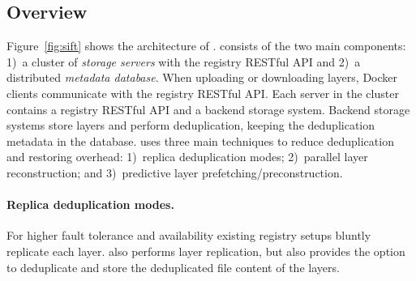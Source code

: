 \subsection{Overview}
\label{sec:overview}



Figure~\ref{fig:sift} shows the architecture of \sysname.
%
\sysname consists of the two main components: %
1)~a cluster of \emph{storage servers}
with the registry RESTful API and 2)~a distributed
\emph{metadata database}. 
%
When uploading or downloading layers, 
Docker clients communicate with the
registry RESTful API.
%
%
Each server in the cluster contains a registry RESTful API and a backend storage system.
%
Backend storage systems store
layers and perform deduplication, keeping the deduplication metadata in the
database.
%
%
%
\sysname uses three main techniques to reduce deduplication and restoring overhead:
1)~replica deduplication modes; 2)~parallel layer reconstruction; and
3)~predictive layer prefetching/preconstruction.




\paragraph{Replica deduplication modes.}
%
For higher fault tolerance and availability existing registry setups bluntly replicate each layer.
%
\sysname also performs layer replication, but also provides the option to deduplicate and store the deduplicated file content of the layers.

